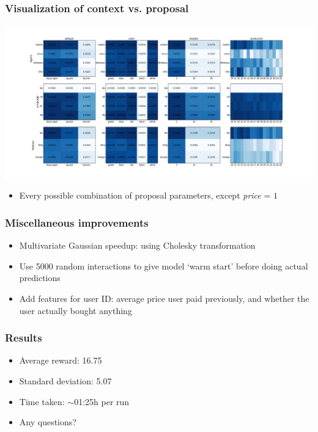 \documentclass{beamer}
\begin{document}
\begin{frame}
	\frametitle{Visualization of context vs. proposal}
	\includegraphics[width=\textwidth]{viewer.png}
	\begin{itemize}
		\item Every possible combination of proposal parameters, except \emph{price} = $1$
	\end{itemize}
\end{frame}


\begin{frame}
	\frametitle{Miscellaneous improvements}
	\begin{itemize}
		\item<1,4> Multivariate Gaussian speedup: using Cholesky transformation
		\item<2,4> Use 5000 random interactions to give model `warm start' before doing actual predictions
		\item<3,4 | alert@4> Add features for user ID: average price user paid previously, and whether the user actually bought anything
	\end{itemize}
\end{frame}


\begin{frame}
  \frametitle{Results}

  \begin{itemize}
   	\item Average reward: 16.75
    \item Standard deviation: 5.07‏
    \item Time taken: $\sim$01:25h per run
    \item Any questions?
  \end{itemize}
\end{frame}
\end{document}

